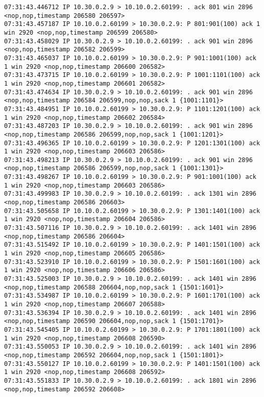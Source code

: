 \documentclass[a4paper,12pt]{article}
\begin{document}
\begin{Verbatim}
07:31:43.446712 IP 10.30.0.2.9 > 10.10.0.2.60199: . ack 801 win 2896 <nop,nop,timestamp 206580 206597>
07:31:43.457187 IP 10.10.0.2.60199 > 10.30.0.2.9: P 801:901(100) ack 1 win 2920 <nop,nop,timestamp 206599 206580>
07:31:43.458029 IP 10.30.0.2.9 > 10.10.0.2.60199: . ack 901 win 2896 <nop,nop,timestamp 206582 206599>
07:31:43.465037 IP 10.10.0.2.60199 > 10.30.0.2.9: P 901:1001(100) ack 1 win 2920 <nop,nop,timestamp 206600 206582>
07:31:43.473715 IP 10.10.0.2.60199 > 10.30.0.2.9: P 1001:1101(100) ack 1 win 2920 <nop,nop,timestamp 206601 206582>
07:31:43.474634 IP 10.30.0.2.9 > 10.10.0.2.60199: . ack 901 win 2896 <nop,nop,timestamp 206584 206599,nop,nop,sack 1 {1001:1101}>
07:31:43.484951 IP 10.10.0.2.60199 > 10.30.0.2.9: P 1101:1201(100) ack 1 win 2920 <nop,nop,timestamp 206602 206584>
07:31:43.487203 IP 10.30.0.2.9 > 10.10.0.2.60199: . ack 901 win 2896 <nop,nop,timestamp 206586 206599,nop,nop,sack 1 {1001:1201}>
07:31:43.496365 IP 10.10.0.2.60199 > 10.30.0.2.9: P 1201:1301(100) ack 1 win 2920 <nop,nop,timestamp 206603 206586>
07:31:43.498213 IP 10.30.0.2.9 > 10.10.0.2.60199: . ack 901 win 2896 <nop,nop,timestamp 206586 206599,nop,nop,sack 1 {1001:1301}>
07:31:43.498267 IP 10.10.0.2.60199 > 10.30.0.2.9: P 901:1001(100) ack 1 win 2920 <nop,nop,timestamp 206603 206586>
07:31:43.499983 IP 10.30.0.2.9 > 10.10.0.2.60199: . ack 1301 win 2896 <nop,nop,timestamp 206586 206603>
07:31:43.505658 IP 10.10.0.2.60199 > 10.30.0.2.9: P 1301:1401(100) ack 1 win 2920 <nop,nop,timestamp 206604 206586>
07:31:43.507116 IP 10.30.0.2.9 > 10.10.0.2.60199: . ack 1401 win 2896 <nop,nop,timestamp 206586 206604>
07:31:43.515492 IP 10.10.0.2.60199 > 10.30.0.2.9: P 1401:1501(100) ack 1 win 2920 <nop,nop,timestamp 206605 206586>
07:31:43.523910 IP 10.10.0.2.60199 > 10.30.0.2.9: P 1501:1601(100) ack 1 win 2920 <nop,nop,timestamp 206606 206586>
07:31:43.525003 IP 10.30.0.2.9 > 10.10.0.2.60199: . ack 1401 win 2896 <nop,nop,timestamp 206588 206604,nop,nop,sack 1 {1501:1601}>
07:31:43.534987 IP 10.10.0.2.60199 > 10.30.0.2.9: P 1601:1701(100) ack 1 win 2920 <nop,nop,timestamp 206607 206588>
07:31:43.536394 IP 10.30.0.2.9 > 10.10.0.2.60199: . ack 1401 win 2896 <nop,nop,timestamp 206590 206604,nop,nop,sack 1 {1501:1701}>
07:31:43.545405 IP 10.10.0.2.60199 > 10.30.0.2.9: P 1701:1801(100) ack 1 win 2920 <nop,nop,timestamp 206608 206590>
07:31:43.550053 IP 10.30.0.2.9 > 10.10.0.2.60199: . ack 1401 win 2896 <nop,nop,timestamp 206592 206604,nop,nop,sack 1 {1501:1801}>
07:31:43.550127 IP 10.10.0.2.60199 > 10.30.0.2.9: P 1401:1501(100) ack 1 win 2920 <nop,nop,timestamp 206608 206592>
07:31:43.551833 IP 10.30.0.2.9 > 10.10.0.2.60199: . ack 1801 win 2896 <nop,nop,timestamp 206592 206608>

\end{Verbatim}
\end{document}
